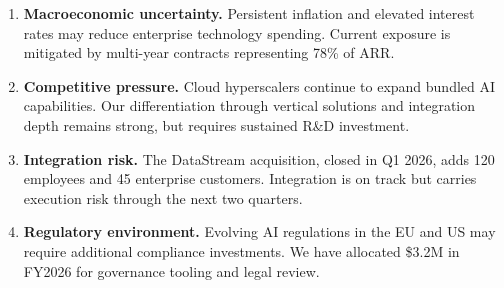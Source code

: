 \documentclass[
    language=english,
    doctype=financial-report,
    institution=none,
]{../../omnilatex}
\begin{document}
\begin{enumerate}
    \item \textbf{Macroeconomic uncertainty.} Persistent inflation and
        elevated interest rates may reduce enterprise technology spending.
        Current exposure is mitigated by multi-year contracts representing
        78\% of ARR.
    \item \textbf{Competitive pressure.} Cloud hyperscalers continue to
        expand bundled AI capabilities. Our differentiation through
        vertical solutions and integration depth remains strong, but
        requires sustained R\&D investment.
    \item \textbf{Integration risk.} The DataStream acquisition, closed in
        Q1 2026, adds 120 employees and 45 enterprise customers.
        Integration is on track but carries execution risk through the
        next two quarters.
    \item \textbf{Regulatory environment.} Evolving AI regulations in the
        EU and US may require additional compliance investments. We have
        allocated \$3.2M in FY2026 for governance tooling and legal review.
\end{enumerate}

\printbibliography[heading=none]
\end{document}
